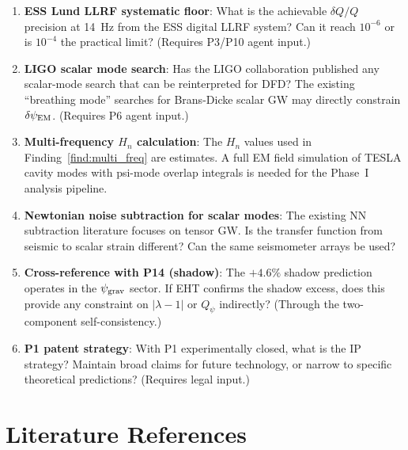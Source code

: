 \documentclass[11pt]{article}
\newcommand{\lam}{\lambda}
\newcommand{\Qpsi}{Q_\psi}
\newcommand{\Heff}{H_n}
\newcommand{\lbone}{|\lam - 1|}
\newcommand{\psigrav}{\psi_{\rm grav}}
\newcommand{\dpsiEM}{\delta\psi_{\rm EM}}
\theoremstyle{definition}
\theoremstyle{remark}
\begin{document}
\begin{enumerate}[label=\textbf{OQ-\arabic*.}, itemsep=4pt]

\item \textbf{ESS Lund LLRF systematic floor}: What is the achievable
  $\delta Q/Q$ precision at 14~Hz from the ESS digital LLRF system?
  Can it reach $10^{-6}$ or is $10^{-4}$ the practical limit?
  (Requires P3/P10 agent input.)

\item \textbf{LIGO scalar mode search}: Has the LIGO collaboration
  published any scalar-mode search that can be reinterpreted for DFD?
  The existing ``breathing mode'' searches for Brans-Dicke scalar GW
  may directly constrain $\dpsiEM$. (Requires P6 agent input.)

\item \textbf{Multi-frequency $\Heff$ calculation}: The $\Heff$ values
  used in Finding~\ref{find:multi_freq} are estimates. A full EM
  field simulation of TESLA cavity modes with psi-mode overlap
  integrals is needed for the Phase~I analysis pipeline.

\item \textbf{Newtonian noise subtraction for scalar modes}: The
  existing NN subtraction literature focuses on tensor GW.
  Is the transfer function from seismic to scalar strain different?
  Can the same seismometer arrays be used?

\item \textbf{Cross-reference with P14 (shadow)}: The $+4.6\%$ shadow
  prediction operates in the $\psigrav$ sector. If EHT confirms the
  shadow excess, does this provide any constraint on $\lbone$ or
  $\Qpsi$ indirectly? (Through the two-component self-consistency.)

\item \textbf{P1 patent strategy}: With P1 experimentally closed,
  what is the IP strategy? Maintain broad claims for future technology,
  or narrow to specific theoretical predictions? (Requires legal input.)

\end{enumerate}

\section*{Literature References}
\end{document}
